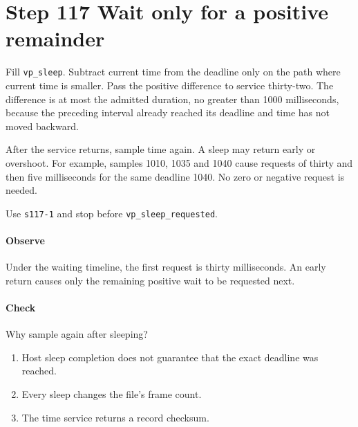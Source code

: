 \section{Step 117 Wait only for a positive remainder}
Fill \texttt{vp\_sleep}. Subtract current time from the deadline only on the path where current time is smaller. Pass the positive difference to service thirty-two. The difference is at most the admitted duration, no greater than 1000 milliseconds, because the preceding interval already reached its deadline and time has not moved backward.

After the service returns, sample time again. A sleep may return early or overshoot. For example, samples 1010, 1035 and 1040 cause requests of thirty and then five milliseconds for the same deadline 1040. No zero or negative request is needed.

Use \texttt{s117-1} and stop before \texttt{vp\_sleep\_requested}.

\paragraph{Observe} Under the waiting timeline, the first request is thirty milliseconds. An early return causes only the remaining positive wait to be requested next.

\paragraph{Check} Why sample again after sleeping?
\begin{enumerate}[label=\Alph*.]
  \item Host sleep completion does not guarantee that the exact deadline was reached.
  \item Every sleep changes the file's frame count.
  \item The time service returns a record checksum.
\end{enumerate}
